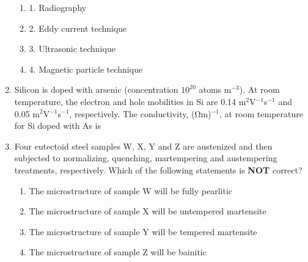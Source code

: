 \documentclass[journal,12pt,onecolumn]{IEEEtran}
\theoremstyle{remark}
\begin{document}
\begin{enumerate}
\begin{minipage}{0.45\textwidth}
    \begin{enumerate}
    \item 1. Radiography
    \item 2. Eddy current technique
    \item 3. Ultrasonic technique
    \item 4. Magnetic particle technique
    \end{enumerate}
    \end{minipage}
    \hfill{}
    \begin{enumerate}[label=(\Alph*)]
    \end{enumerate}
    \item Silicon is doped with arsenic (concentration $10^{20}$ atoms m$^{-3}$). At room temperature, the electron and hole mobilities in Si are 0.14 m$^2$V$^{-1}$s$^{-1}$ and 0.05 m$^2$V$^{-1}$s$^{-1}$, respectively. The conductivity, (Ωm)$^{-1}$, at room temperature for Si doped with As is
    \hfill{}
    \begin{enumerate}[label=(\Alph*)]
    \end{enumerate}
    \item Four eutectoid steel samples W, X, Y and Z are austenized and then subjected to normalizing, quenching, martempering and austempering treatments, respectively. Which of the following statements is \textbf{NOT} correct?
    \hfill{}
    \begin{enumerate}[label=(\Alph*)]
    \item The microstructure of sample W will be fully pearlitic
    \item The microstructure of sample X will be untempered martensite
    \item The microstructure of sample Y will be tempered martensite
    \item The microstructure of sample Z will be bainitic
    \end{enumerate}


\end{enumerate}
\end{document}
